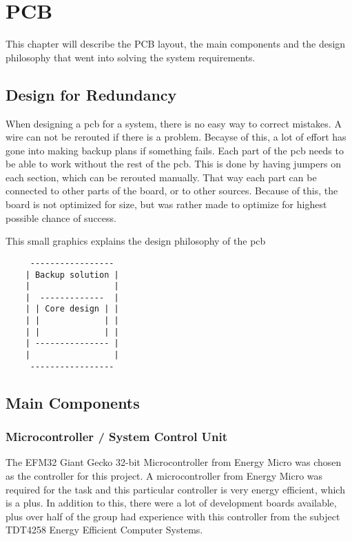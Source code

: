 \chapter{PCB}
\label{sec:pcb}

This chapter will describe the PCB layout, the main components and the design philosophy that went into solving the system requirements.


\section{Design for Redundancy}

When designing a pcb for a system, there is no easy way to correct mistakes.
A wire can not be rerouted if there is a problem.
Becayse of this, a lot of effort has gone into making backup plans if something fails.
Each part of the pcb needs to be able to work without the rest of the pcb.
This is done by having jumpers on each section, which can be rerouted manually.
That way each part can be connected to other parts of the board, or to other sources.
Because of this, the board is not optimized for size, but was rather made to optimize for highest possible chance of success.

This small graphics explains the design philosophy of the pcb
\begin{verbatim}
     -----------------
    | Backup solution |
    |                 |
    |  -------------  |
    | | Core design | |
    | |             | |
    | |             | |
    | --------------- |
    |                 |
     -----------------
\end{verbatim}

\section{Main Components}

\subsection{Microcontroller / System Control Unit}
The EFM32 Giant Gecko 32-bit Microcontroller from Energy Micro was chosen as the controller for this project.
A microcontroller from Energy Micro was required for the task and this particular controller is
very energy efficient, which is a plus.
In addition to this, there were a lot of development boards available,
plus over half of the group had experience with this controller from the subject
TDT4258 Energy Efficient Computer Systems.

